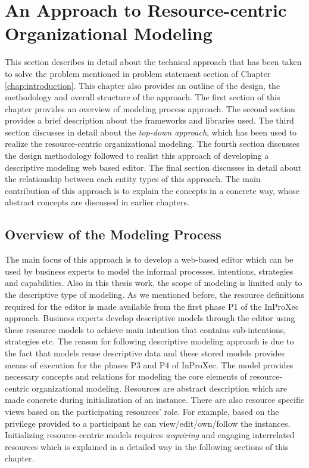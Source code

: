 \chapter{An Approach to Resource-centric Organizational Modeling}
\label{chap:approach}
This section describes in detail about the technical approach that has been taken to solve the problem mentioned in problem statement section of Chapter \ref{chap:introduction}. This chapter also provides an outline of the design, the methodology and overall structure of the approach. The first section of this chapter provides an overview of modeling process approach. The second section  provides a brief description about the frameworks and libraries used. The third section discusses in detail about the \textit{top-down approach}, which has been used to realize the resource-centric organizational modeling. The fourth section discusses the design methodology followed to realist this approach of developing a descriptive modeling web based editor. The final section discusses in detail about the relationship between each entity types of this approach. The main contribution of this approach is to explain the concepts in a concrete way, whose abstract concepts are discussed in earlier chapters.

\section{Overview of the Modeling Process}
\label{sec:overviewmodelingprocess}
The main focus of this approach is to develop a web-based editor which can be used by business experts to model the informal processes, intentions, strategies and capabilities. Also in this thesis work, the scope of modeling is limited only to the descriptive type of modeling. As we mentioned before, the resource definitions required for the editor is made available from the first phase P1 of the InProXec approach. Business experts develop descriptive models through the editor using these resource models to achieve main intention that contains sub-intentions, strategies etc. The reason for following descriptive modeling approach is due to the fact that models reuse descriptive data and these stored models provides means of execution for the phases P3 and P4 of InProXec. The model provides necessary concepts and relations for modeling the core elements of resource-centric organizational modeling. Resources are abstract description which are made concrete during initialization of an instance. There are also resource specific views based on the participating resources' role. For example, based on the privilege provided to a participant he can view/edit/own/follow the instances. Initializing resource-centric models requires \textit{acquiring} and engaging interrelated resources \cite{Sungur2015} which is explained in a detailed way in the following sections of this chapter. 

